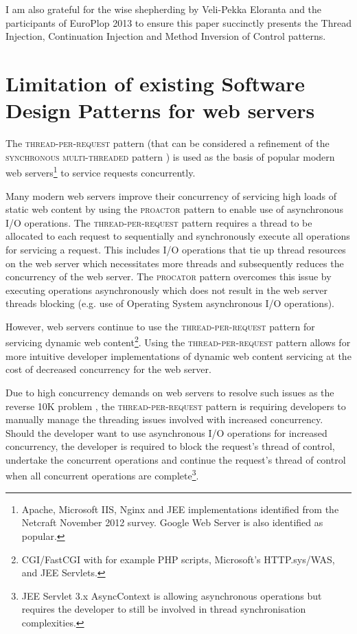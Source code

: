 \documentclass[prodmode]{style/acmlarge}
\begin{document}
I am also grateful for the wise shepherding by Veli-Pekka Eloranta and the
participants of EuroPlop 2013 to ensure this paper succinctly presents the
Thread Injection, Continuation Injection and Method Inversion of Control
patterns.



\section{Limitation of existing Software Design Patterns for web servers}

The \textsc{thread-per-request} pattern \cite{thread-per-request} (that can be
considered a refinement of the \textsc{synchronous multi-threaded} pattern
\cite{proactor}) is used as the basis of popular modern web
servers\footnote{Apache, Microsoft IIS, Nginx and JEE implementations identified
from the Netcraft November 2012 survey.  Google Web Server is also identified as
popular.} to service requests concurrently.

Many modern web servers improve their concurrency of servicing high loads of
static web content by using the \textsc{proactor} pattern \cite{proactor} to
enable use of asynchronous I/O operations.  The \textsc{thread-per-request}
pattern requires a thread to be allocated to each request to sequentially and
synchronously execute all operations for servicing a request.  This includes I/O
operations that tie up thread resources on the web server which necessitates
more threads and subsequently reduces the concurrency of the web server.  The
\textsc{procator} pattern overcomes this issue by executing operations
asynchronously which does not result in the web server threads blocking (e.g.
use of Operating System asynchronous I/O operations).

However, web servers continue to use the \textsc{thread-per-request} pattern for
servicing dynamic web content\footnote{CGI/FastCGI with for example PHP scripts,
Microsoft's HTTP.sys/WAS, and JEE Servlets.}.  Using the
\textsc{thread-per-request} pattern allows for more intuitive developer
implementations of dynamic web content servicing at the cost of decreased
concurrency for the web server.

Due to high concurrency demands on web servers to resolve such issues as the
reverse 10K problem \cite{reverse-ten-k-problem}, the
\textsc{thread-per-request} pattern is requiring developers to manually manage
the threading issues involved with increased concurrency.  Should the developer
want to use asynchronous I/O operations for increased concurrency, the developer
is required to block the request's thread of control, undertake the concurrent
operations and continue the request's thread of control when all concurrent
operations are complete\footnote{JEE Servlet 3.x AsyncContext is allowing
asynchronous operations but requires the developer to still be involved in
thread synchronisation complexities.}.
\end{document}
